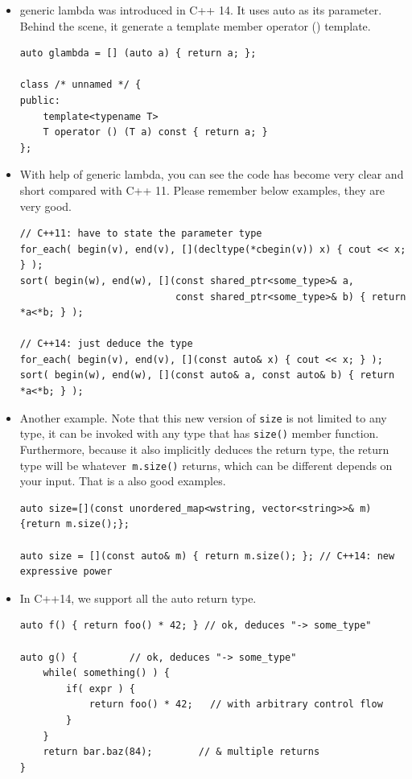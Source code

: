 \documentclass[a4paper,11pt,twoside]{book}
\begin{document}
\begin{itemize}
		\item generic lambda was introduced in C++ 14. It uses auto as its parameter. Behind the scene, it generate a template member operator () template. 
\begin{lstlisting}
auto glambda = [] (auto a) { return a; };

class /* unnamed */ {
public:
    template<typename T>
    T operator () (T a) const { return a; }
};
\end{lstlisting}

		\item With help of generic lambda, you can see the code has become very clear and short compared with C++ 11. Please remember below examples, they are very good.

\begin{lstlisting}
// C++11: have to state the parameter type
for_each( begin(v), end(v), [](decltype(*cbegin(v)) x) { cout << x; } );
sort( begin(w), end(w), [](const shared_ptr<some_type>& a, 
                           const shared_ptr<some_type>& b) { return *a<*b; } );

// C++14: just deduce the type
for_each( begin(v), end(v), [](const auto& x) { cout << x; } );
sort( begin(w), end(w), [](const auto& a, const auto& b) { return *a<*b; } );
\end{lstlisting}

		\item Another example.  Note that this new version of \texttt{size} is not limited to any type, it can be invoked with any type that has \texttt{size()} member function. Furthermore, because it also implicitly deduces the return type, the return type will be whatever\texttt{ m.size()} returns, which can be different depends on your input. That is a also good examples.

\begin{lstlisting}
auto size=[](const unordered_map<wstring, vector<string>>& m){return m.size();};

auto size = [](const auto& m) { return m.size(); }; // C++14: new expressive power
\end{lstlisting}

		\item In C++14, we support all the auto return type. 

\begin{lstlisting}
auto f() { return foo() * 42; } // ok, deduces "-> some_type"

auto g() {         // ok, deduces "-> some_type"
    while( something() ) {
        if( expr ) {
            return foo() * 42;   // with arbitrary control flow
        }
    }
    return bar.baz(84);        // & multiple returns
}              
\end{lstlisting}


\end{itemize}
\end{document}
